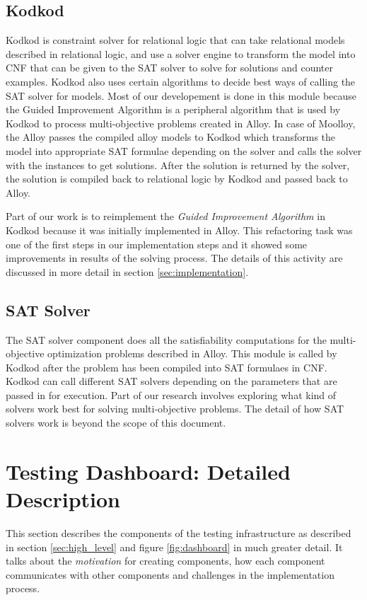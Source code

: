 \documentclass[11pt]{article}
\theoremstyle{definition}
\begin{document}
\subsection{Kodkod}\label{sec:kodkod}
Kodkod \cite{ref:kodkod} is constraint solver for relational logic that can take relational models described in relational logic, and use a solver engine to transform the model into CNF that can be given to the SAT solver to solve for solutions and counter examples. Kodkod also uses certain algorithms to decide best ways of calling the SAT solver for models. Most of our developement is done in this module because the Guided Improvement Algorithm is a peripheral algorithm that is used by Kodkod to process multi-objective problems created in Alloy. In case of Moolloy, the Alloy passes the compiled alloy models to Kodkod which transforms the model into appropriate SAT formulae depending on the solver and calls the solver with the instances to get solutions. After the solution is returned by the solver, the solution is compiled back to relational logic by Kodkod and passed back to Alloy.

Part of our work is to reimplement the \emph{Guided Improvement Algorithm} in Kodkod because it was initially implemented in Alloy. This refactoring task was one of the first steps in our implementation steps and it showed some improvements in results of the solving process. The details of this activity are discussed in more detail in section \ref{sec:implementation}.

\subsection{SAT Solver}\label{sec:SAT}
The SAT solver component does all the satisfiability computations for the multi-objective optimization problems described in Alloy. This module is called by Kodkod after the problem has been compiled into SAT formulaes in CNF. Kodkod can call different SAT solvers depending on the parameters that are passed in for execution. Part of our research involves exploring what kind of solvers work best for solving multi-objective problems. The detail of how SAT solvers work is beyond the scope of this document.

\section{Testing Dashboard: Detailed Description}\label{dashboard}
This section describes the components of the testing infrastructure as described in section \ref{sec:high_level} and figure \ref{fig:dashboard} in much greater detail. It talks about the \emph{motivation} for creating components, how each component communicates with other components and challenges in the implementation process.
\end{document}
